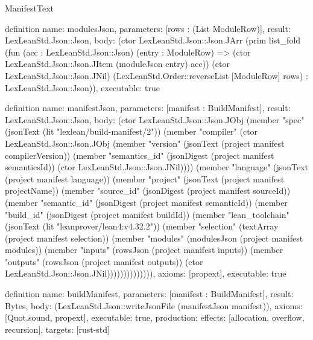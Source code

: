 \begin{lexlean}{ManifestText}
\begin{semanticmodule}
definition{
  name: modulesJson,
  parameters: [rows : (List ModuleRow)],
  result: LexLeanStd.Json::Json,
  body: (ctor LexLeanStd.Json::Json.JArr (prim list_fold (fun (acc : LexLeanStd.Json::Json) (entry : ModuleRow) => (ctor LexLeanStd.Json::Json.JItem (moduleJson entry) acc)) (ctor LexLeanStd.Json::Json.JNil) (LexLeanStd.Order::reverseList [ModuleRow] rows) : LexLeanStd.Json::Json)),
  executable: true
}

definition{
  name: manifestJson,
  parameters: [manifest : BuildManifest],
  result: LexLeanStd.Json::Json,
  body: (ctor LexLeanStd.Json::Json.JObj (member "spec" (jsonText (lit "lexlean/build-manifest/2")) (member "compiler" (ctor LexLeanStd.Json::Json.JObj (member "version" (jsonText (project manifest compilerVersion)) (member "semantics_id" (jsonDigest (project manifest semanticsId)) (ctor LexLeanStd.Json::Json.JNil)))) (member "language" (jsonText (project manifest language)) (member "project" (jsonText (project manifest projectName)) (member "source_id" (jsonDigest (project manifest sourceId)) (member "semantic_id" (jsonDigest (project manifest semanticId)) (member "build_id" (jsonDigest (project manifest buildId)) (member "lean_toolchain" (jsonText (lit "leanprover/lean4:v4.32.2")) (member "selection" (textArray (project manifest selection)) (member "modules" (modulesJson (project manifest modules)) (member "inputs" (rowsJson (project manifest inputs)) (member "outputs" (rowsJson (project manifest outputs)) (ctor LexLeanStd.Json::Json.JNil)))))))))))))),
  axioms: [propext],
  executable: true
}

definition{
  name: buildManifest,
  parameters: [manifest : BuildManifest],
  result: Bytes,
  body: (LexLeanStd.Json::writeJsonFile (manifestJson manifest)),
  axioms: [Quot.sound, propext],
  executable: true,
  production: {effects: [allocation, overflow, recursion], targets: [rust-std]}
}
\end{semanticmodule}
\end{lexlean}
